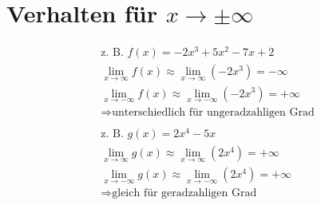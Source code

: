 \section{Verhalten für $x \to \pm \infty$}
\begin{gather*}
  \text{z. B. } f(x) = -2x^3 + 5x^2 - 7x + 2 \\
  \lim\limits_{x \to \infty} f(x) \approx \lim\limits_{x \to \infty} (-2x^3) = -\infty \\
  \lim\limits_{x \to -\infty} f(x) \approx \lim\limits_{x \to -\infty} (-2x^3) = +\infty \\
  \Rightarrow \text{unterschiedlich für ungeradzahligen Grad} \\\\
  \text{z. B. } g(x) = 2x^4 - 5x \\
  \lim\limits_{x \to \infty} g(x) \approx \lim\limits_{x \to \infty} (2x^4) = +\infty \\
  \lim\limits_{x \to -\infty} g(x) \approx \lim\limits_{x \to -\infty} (2x^4) = +\infty \\
  \Rightarrow \text{gleich für geradzahligen Grad} \\\\
\end{gather*}

